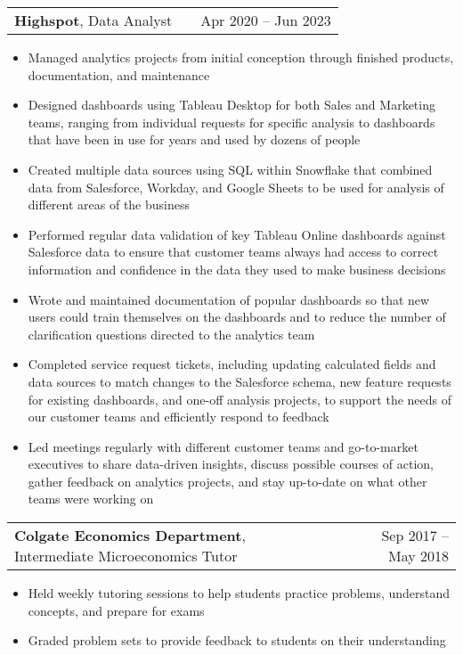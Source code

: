 \documentclass[a4paper,12pt]{article}
\makeatletter
\newenvironment{joblong}[2]
    {
    \begin{tabularx}{\linewidth}{@{}l X r@{}}
    #1 & \hfill &  #2 \\[3.75pt]
    \end{tabularx}
    \begin{minipage}[t]{\linewidth}
    \begin{itemize}[nosep,after=\strut, leftmargin=1em, itemsep=3pt,label=--]
    }
    {
    \end{itemize}
    \end{minipage}    
    }
\makeatother
\begin{document}
\begin{joblong}{\textbf{Highspot}, Data Analyst}{Apr 2020 -- Jun 2023}
\item Managed analytics projects from initial conception through finished products, documentation, and maintenance
\item Designed dashboards using Tableau Desktop for both Sales and Marketing teams, ranging from individual requests for specific analysis to dashboards that have been in use for years and used by dozens of people
\item Created multiple data sources using SQL within Snowflake that combined data from Salesforce, Workday, and Google Sheets to be used for analysis of different areas of the business
\item Performed regular data validation of key Tableau Online dashboards against Salesforce data to ensure that customer teams always had access to correct information and confidence in the data they used to make business decisions
\item Wrote and maintained documentation of popular dashboards so that new users could train themselves on the dashboards and to reduce the number of clarification questions directed to the analytics team
\item Completed service request tickets, including updating calculated fields and data sources to match changes to the Salesforce schema, new feature requests for existing dashboards, and one-off analysis projects, to support the needs of our customer teams and efficiently respond to feedback
\item Led meetings regularly with different customer teams and go-to-market executives to share data-driven insights, discuss possible courses of action, gather feedback on analytics projects, and stay up-to-date on what other teams were working on
\end{joblong}

\begin{joblong}{\textbf{Colgate Economics Department}, Intermediate Microeconomics Tutor}{Sep 2017 -- May 2018}
\item Held weekly tutoring sessions to help students practice problems, understand concepts, and prepare for exams
\item Graded problem sets to provide feedback to students on their understanding
\end{joblong}


\end{document}
